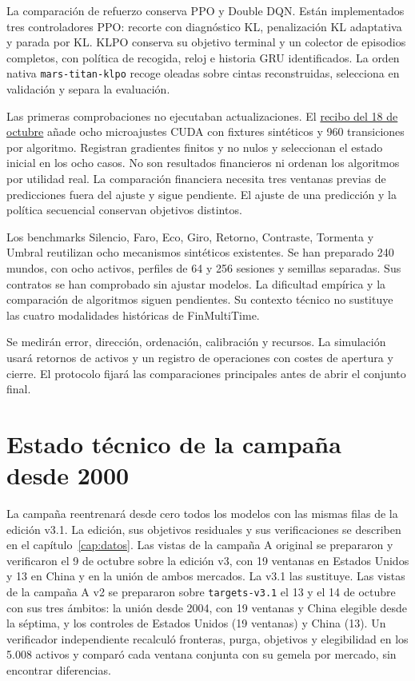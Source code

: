 \documentclass[11pt,a4paper]{report}
\begin{document}
La comparación de refuerzo conserva PPO y Double DQN. Están implementados tres
controladores PPO: recorte con diagnóstico KL, penalización KL adaptativa y
parada por KL. KLPO conserva su objetivo terminal y un colector de episodios
completos, con política de recogida, reloj e historia GRU identificados. La
orden nativa \texttt{mars-titan-klpo} recoge oleadas sobre cintas reconstruidas,
selecciona en validación y separa la evaluación.

Las primeras comprobaciones no ejecutaban actualizaciones. El
\href{https://github.com/GonxKZ/mars-titan/blob/8b7e2a5600be568cc1299f2a661da15b5090c45e/reports/research/memory-microstudy-20261018/README.md}{recibo del 18 de octubre}
añade ocho microajustes CUDA con fixtures sintéticos y 960 transiciones por
algoritmo. Registran gradientes finitos y no nulos y seleccionan el estado
inicial en los ocho casos. No son resultados financieros ni ordenan los
algoritmos por utilidad real. La comparación financiera necesita tres ventanas
previas de predicciones fuera del ajuste y sigue pendiente. El ajuste de una
predicción y la política secuencial conservan objetivos distintos.

Los benchmarks Silencio, Faro, Eco, Giro, Retorno, Contraste, Tormenta y Umbral
reutilizan ocho mecanismos sintéticos existentes. Se han preparado 240 mundos,
con ocho activos, perfiles de 64 y 256 sesiones y semillas separadas. Sus contratos
se han comprobado sin ajustar modelos. La dificultad empírica y la comparación
de algoritmos siguen pendientes. Su contexto técnico no sustituye las cuatro
modalidades históricas de FinMultiTime.

Se medirán error, dirección, ordenación, calibración y recursos. La simulación usará
retornos de activos y un registro de operaciones con costes de apertura y cierre.
El protocolo fijará las comparaciones principales antes de abrir el conjunto final.

\section{Estado técnico de la campaña desde 2000}
La campaña reentrenará desde cero todos los modelos con las mismas filas de la
edición v3.1. La edición, sus objetivos residuales y sus verificaciones se
describen en el capítulo~\ref{cap:datos}. Las vistas de la campaña A original
se prepararon y verificaron el 9 de octubre sobre la edición v3, con 19
ventanas en Estados Unidos y 13 en China y en la unión de ambos mercados. La
v3.1 las sustituye. Las vistas de la campaña A v2 se prepararon sobre
\texttt{targets-v3.1} el 13 y el 14 de octubre con sus tres ámbitos: la unión
desde 2004, con 19 ventanas y China elegible desde la séptima, y los controles
de Estados Unidos (19 ventanas) y China (13). Un verificador independiente
recalculó fronteras, purga, objetivos y elegibilidad en los 5.008 activos y
comparó cada ventana conjunta con su gemela por mercado, sin encontrar
diferencias.
\end{document}
